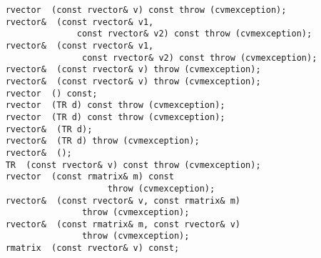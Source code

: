 \verb"    rvector "\verb" (const rvector& v) const throw (cvmexception);"\\
\verb"    rvector& "\verb" (const rvector& v1,"\\
\verb"                  const rvector& v2) const throw (cvmexception);"\\
\verb"    rvector& "\verb" (const rvector& v1,"\\
\verb"                   const rvector& v2) const throw (cvmexception);"\\
\verb"    rvector& "\verb" (const rvector& v) throw (cvmexception);"\\
\verb"    rvector& "\verb" (const rvector& v) throw (cvmexception);"\\
\verb"    rvector "\verb" () const;"\\
\verb"    rvector "\verb" (TR d) const throw (cvmexception);"\\
\verb"    rvector "\verb" (TR d) const throw (cvmexception);"\\
\verb"    rvector& "\verb" (TR d);"\\
\verb"    rvector& "\verb" (TR d) throw (cvmexception);"\\
\verb"    rvector& "\verb" ();"\\
\verb"    TR "\verb" (const rvector& v) const throw (cvmexception);"\\
\verb"    rvector "\verb" (const rmatrix& m) const"\\
\verb"                        throw (cvmexception);"\\
\verb"    rvector& "\verb" (const rvector& v, const rmatrix& m)"\\
\verb"                   throw (cvmexception);"\\
\verb"    rvector& "\verb" (const rmatrix& m, const rvector& v)"\\
\verb"                   throw (cvmexception);"\\
\verb"    rmatrix "\verb" (const rvector& v) const;"\\
